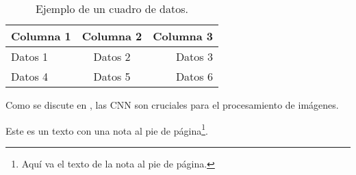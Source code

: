 
\begin{table}[ht]
    \centering
    \caption{Ejemplo de un cuadro de datos.}
    \begin{tabular}{lcr}
        \toprule
        Columna 1 & Columna 2 & Columna 3 \\
        \midrule
        Datos 1 & Datos 2 & Datos 3 \\
        Datos 4 & Datos 5 & Datos 6 \\
        \bottomrule
    \end{tabular}
    \label{tab:ejemplo-datos}
\end{table}

Como se discute en \cite{investigador2023}, las CNN son cruciales para el procesamiento de imágenes.

Este es un texto con una nota al pie de página\footnote{Aquí va el texto de la nota al pie de página.}.


